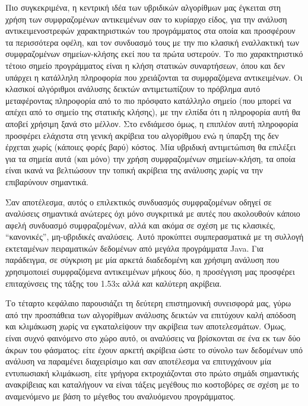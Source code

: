 Πιο συγκεκριμένα, η κεντρική ιδέα των υβριδικών αλγορίθμων μας έγκειται στη χρήση των συμφραζομένων αντικειμένων σαν το κυρίαρχο είδος, για την ανάλυση αντικειμενοστρεφών χαρακτηριστικών του προγράμματος στα οποία και προσφέρουν τα περισσότερα οφέλη, και τον συνδυασμό τους με την πιο κλασική εναλλακτική των συμφραζομένων σημείων-κλήσης εκεί που τα πρώτα υστερούν. Το πιο χαρακτηριστικό τέτοιο σημείο προγράμματος είναι η κλήση στατικών συναρτήσεων, όπου και δεν υπάρχει η κατάλληλη πληροφορία που χρειάζονται τα συμφραζόμενα αντικειμένων. Οι κλασικοί αλγόριθμοι ανάλυσης δεικτών αντιμετωπίζουν το πρόβλημα αυτό μεταφέροντας πληροφορία από το πιο πρόσφατο κατάλληλο σημείο (που μπορεί να απέχει από το σημείο της στατικής κλήσης), με την ελπίδα ότι η πληροφορία αυτή θα αποβεί χρήσιμη ξανά στο μέλλον. Στο ενδιάμεσο όμως, η επιπλέον αυτή πληροφορία προσφέρει ελάχιστα στη γενική ακρίβεια του αλγορίθμου ενώ η ύπαρξη της δεν έρχεται χωρίς (κάποιες φορές βαρύ) κόστος. Μία υβριδική αντιμετώπιση θα επιλέξει για τα σημεία αυτά (και μόνο) την χρήση συμφραζομένων σημείων-κλήση, τα οποία είναι ικανά να βελτιώσουν την τοπική ακρίβεια της ανάλυσης χωρίς να την επιβαρύνουν σημαντικά.

Σαν αποτέλεσμα, αυτός ο επιλεκτικός συνδυασμός συμφραζομένων οδηγεί σε αναλύσεις σημαντικά ανώτερες όχι μόνο συγκριτικά με αυτές που ακολουθούν κάποιο αφελή συνδυασμό συμφραζομένων, αλλά και ακόμα σε σχέση με τις κλασικές, ``κανονικές'', μη-υβριδικές αναλύσεις. Αυτό προκύπτει συμπερασματικά με τη συλλογή εκτεταμένων πειραματικών δεδομένων από μεγάλα προγράμματα {\en Java}. Για παράδειγμα, σε σύγκριση με μία αρκετά διαδεδομένη και χρήσιμη ανάλυση που χρησιμοποιεί συμφραζόμενα αντικειμένων μήκους δύο, η προσέγγιση μας προσφέρει επιταχύνσεις της τάξης του {\en 1.53x} αλλά \emph{και} καλύτερη ακρίβεια.


Το τέταρτο κεφάλαιο παρουσιάζει τη δεύτερη επιστημονική συνεισφορά μας, γύρω από την προσπάθεια των αλγορίθμων ανάλυσης δεικτών να επιτύχουν καλή απόδοση και κλιμάκωση χωρίς να εγκαταλείψουν την ακρίβεια των αποτελεσμάτων. \mbox{Όμως}, είναι συχνό φαινόμενο στο χώρο αυτό, οι αναλύσεις να βρίσκονται σε ένα εκ των δύο άκρων του φάσματος: είτε έχουν αρκετή ακρίβεια ώστε το σύνολο των δεδομένων υπό ανάλυση να παραμένει διαχειρίσιμο και σαν αποτέλεσμα να επιτυγχάνουν μία εντυπωσιακή κλιμάκωση, είτε γρήγορα εκτροχιάζονται στο πρώτο σημάδι σημαντικής ανακρίβειας και καταλήγουν να \mbox{είναι} τάξεις μεγέθους πιο κοστοβόρες σε σχέση με το αναμενόμενο με βάση το μέγεθος του αναλυόμενου προγράμματος.

